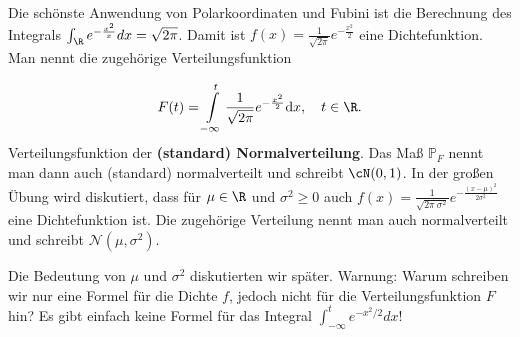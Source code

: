 \begin{beispiel}
	Die sch\"onste Anwendung von Polarkoordinaten und Fubini ist die Berechnung des Integrals $\int_\R e^{-\frac{x^2}{x}}dx=\sqrt{2\pi}$. Damit ist $f(x)=\frac{1}{\sqrt{2\pi}} e^{-\frac{x^2}{2}}$ eine Dichtefunktion. Man nennt die zugeh\"orige Verteilungsfunktion

	\[ F(t) = \int\limits_{-\infty}^{t} \frac{1}{\sqrt{2\pi}} e^{-\frac{x^2}{2}} \text{d}x,\quad t\in\R.\]  Verteilungsfunktion der \textbf{(standard) Normalverteilung}. Das Ma\ss{} $\mathbb P_F$ nennt man dann auch (standard) normalverteilt und schreibt \textbf{ $\cN(0,1)$}. In der gro\ss en \"Ubung wird diskutiert, dass f\"ur $\mu\in\R$ und $\sigma^2\geq 0$ auch $f(x)=\frac{1}{\sqrt{2\pi\ \sigma^2}} e^{-\frac{(x-\mu)^2}{2\sigma^2}}$ eine Dichtefunktion ist. Die zugeh\"orige Verteilung nennt man auch normalverteilt und schreibt $\mathcal N(\mu, \sigma^2)$. 
\begin{center}
	\end{center}		
	
	
	Die Bedeutung von $\mu$ und $\sigma^2$ diskutierten wir sp\"ater. Warnung: Warum schreiben wir nur eine Formel f\"ur die Dichte $f$, jedoch nicht f\"ur die Verteilungsfunktion $F$ hin? Es gibt einfach keine Formel f\"ur das Integral $\int_{-\infty}^t e^{-x^2/2}dx$!
	
	
\end{beispiel}


